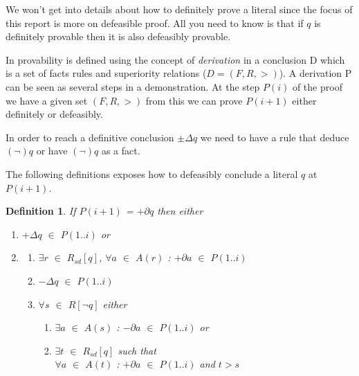 \documentclass[10pt]{report}
\begin{document}
We won't get into details about how to definitely prove a literal since the focus of this report is more on defeasible proof. All you need to know is that if $q$ is definitely provable then it is also defeasibly provable.

In \autocite{RepresentationResultsDefeasibleLogic} provability is defined using the concept of \emph{derivation} in a conclusion D which is a set of facts rules and superiority relations ($D=(F,R,>)$). A derivation P can be seen as several steps in a demonstration. At the step $P(i)$ of the proof we have a given set $(F,R,>)$ from this we can prove $P(i+1)$ either definitely or defeasibly.

In order to reach a definitive conclusion $\pm\Delta q$ we need to have a rule that deduce $(\neg)q$ or have $(\neg)q$ as a fact. 

The following definitions exposes how to defeasibly conclude a literal $q$ at $P(i+1)$.
\newtheorem{mydef}{Definition}
\begin{mydef} \label{def-defeasible-proof}
If $P(i+1)$ = $+\partial q$ then either
\begin{enumerate}
\item $+\Delta q$ $\in$ $P(1..i)$ or
\item \begin{enumerate}
      \item $\exists r$ $\in$ $R_{sd}[q]$, $\forall a$ $\in$ $A(r)$ : $+\partial a$ $\in$ $P(1..i)$
      \item $-\Delta q$ $\in$ $P(1..i)$
      \item $\forall s$ $\in$ $R[\neg q]$ either
          \begin{enumerate}
          \item $\exists a$ $\in$ $A(s)$ : $-\partial a$ $\in$ $P(1..i)$ or
          \item $\exists t$ $\in$ $R_{sd}[q]$ such that \\ $\forall a$ $\in$ $A(t)$ : $+\partial a$ $\in$ $P(1..i)$ and $t>s$
          \end{enumerate}
      \end{enumerate}
\end{enumerate}


\end{mydef}
\end{document}
